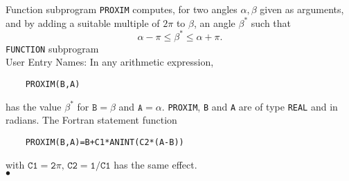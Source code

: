                        
          
\Submitter{}                             
                 
Function subprogram {\tt PROXIM} computes, for two angles $\alpha,\beta$
given as arguments, and by adding a suitable multiple of $2\pi$ to
$\beta$, an angle $\beta^*$ such that
$$ \alpha -\pi \leq \beta^* \leq \alpha + \pi. $$
\Structure
{\tt FUNCTION} subprogram \\
User Entry Names: 
\Usage
In any arithmetic expression,
\begin{verbatim}
    PROXIM(B,A)
\end{verbatim}
has the value $\beta^*$ for $\mathtt{B}=\beta$ and $\mathtt{A}=\alpha$.
{\tt PROXIM}, {\tt B} and {\tt A} are of type {\tt REAL} and in radians.
\Notes
The Fortran statement function
\begin{verbatim}
    PROXIM(B,A)=B+C1*ANINT(C2*(A-B))
\end{verbatim}
with $\mathtt{C1=2\pi,\,C2=1/C1}$ has the same effect.
\\ $\bullet$
